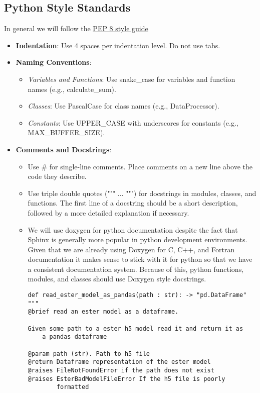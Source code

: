 \documentclass{ol-softwaremanual}
\begin{document}
\subsection{Python Style Standards}
In general we will follow the \href{https://peps.python.org/pep-0008/}{PEP 8 style guide}
\begin{itemize}
\item \textbf{Indentation}: Use 4 spaces per indentation level. Do not use tabs.
\item \textbf{Naming Conventions}:
\begin{itemize}
        \item \textit{Variables and Functions}: Use snake\_case for variables and function names (e.g., calculate\_sum).
        \item \textit{Classes}: Use PascalCase for class names (e.g., DataProcessor).
        \item \textit{Constants}: Use UPPER\_CASE with underscores for constants (e.g., MAX\_BUFFER\_SIZE).
\end{itemize}
\item \textbf{Comments and Docstrings}:
\begin{itemize}
        \item Use \# for single-line comments. Place comments on a new line above the code they describe.
        \item Use triple double quotes (""" ... """) for docstrings in modules, classes, and functions. The first line of a docstring should be a short description, followed by a more detailed explanation if necessary.
        \item We will use doxygen for python documentation despite the fact that Sphinx is generally more popular in python development environments. Given that we are already using Doxygen for C, C++, and Fortran documentation it makes sense to stick with it for python so that we have a consistent documentation system. Because of this, python functions, modules, and classes should use Doxygen style docstrings.
\begin{example}
\begin{verbatim}
def read_ester_model_as_pandas(path : str): -> "pd.DataFrame"
"""
@brief read an ester model as a dataframe.

Given some path to a ester h5 model read it and return it as
    a pandas dataframe

@param path (str). Path to h5 file
@return Dataframe representation of the ester model
@raises FileNotFoundError if the path does not exist
@raises EsterBadModelFileError If the h5 file is poorly
        formatted


\end{verbatim}
\end{example}
\end{itemize}
\end{itemize}
\end{document}
